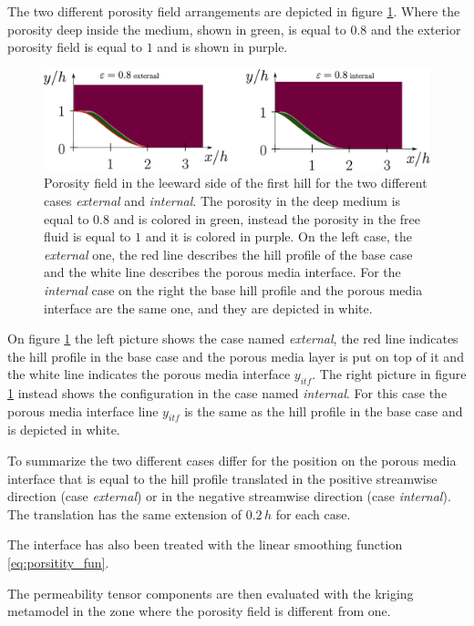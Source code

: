 The two different porosity field arrangements are depicted in figure \ref{fig:por_gauss}. Where the porosity deep inside the medium, shown in green, is equal to $0.8$ and the exterior porosity field is equal to $1$ and is shown in purple.

\begin{figure}[h]
	\centering
	\includegraphics[width=1\linewidth]{chapter_5/figure/por}
	\caption{Porosity field in the leeward side of the first hill for the two different cases \textit{external} and \textit{internal}. The porosity in the deep medium is equal to $0.8$ and is colored in green, instead the porosity in the free fluid is equal to $1$ and it is colored in purple. On the left case, the \textit{external} one, the red line describes the hill profile of the base case and the white line describes the porous media interface. For the \textit{internal} case on the right the base hill profile and the porous media interface are the same one, and they are depicted in white.}
	\label{fig:por_gauss}
\end{figure}

On figure \ref{fig:por_gauss} the left picture shows the case named \textit{external}, the red line indicates the hill profile in the base case and the porous media layer is put on top of it and the white line indicates the porous media interface $y_{itf}$.
The right picture in figure \ref{fig:por_gauss} instead shows the configuration in the case named \textit{internal}. For this case the porous media interface line $y_{itf}$ is the same as the hill profile in the base case and is depicted in white.

To summarize the two different cases differ for the position on the porous media interface that is equal to the hill profile translated in the positive streamwise direction (case \textit{external}) or in the negative streamwise direction (case \textit{internal}). The translation has the same extension of $0.2\,h$ for each case.

The interface has also been treated with the linear smoothing function \eqref{eq:porsitity_fun}.

The permeability tensor components are then evaluated with the kriging metamodel in the zone where the porosity field is different from one.


